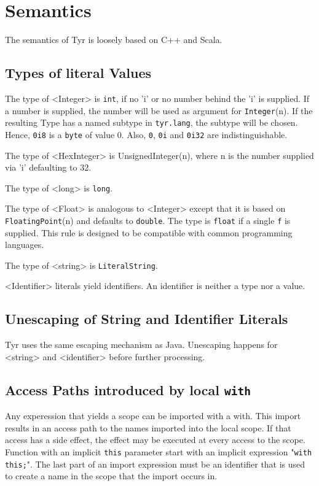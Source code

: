\section{Semantics}

The semantics of Tyr is loosely based on C++ and Scala.

\subsection{Types of literal Values}

The type of <Integer> is \texttt{int}, if no 'i' or no number behind the 'i' is supplied.
If a number is supplied, the number will be used as argument for \texttt{Integer}(n).
If the resulting Type has a named subtype in \texttt{tyr.lang}, the subtype will be chosen.
Hence, \texttt{0i8} is a \texttt{byte} of value 0.
Also, \texttt{0}, \texttt{0i} and \texttt{0i32} are indistinguishable.

The type of <HexInteger> is UnsignedInteger(n), where n is the number supplied via 'i' defaulting to 32.

The type of <long> is \texttt{long}.

The type of <Float> is analogous to <Integer> except that it is based on \texttt{FloatingPoint}(n) and defaults to \texttt{double}.
The type is \texttt{float} if a single \texttt{f} is supplied.
This rule is designed to be compatible with common programming languages.

The type of <string> is \texttt{LiteralString}.

<Identifier> literals yield identifiers.
An identifier is neither a type nor a value.

\subsection{Unescaping of String and Identifier Literals}

Tyr uses the same escaping mechanism as Java.
Unescaping happens for <string> and <identifier> before further processing.


\subsection{Access Paths introduced by local \texttt{with}}

Any experession that yields a scope can be imported with a with.
This import results in an access path to the names imported into the local scope.
If that access has a side effect, the effect may be executed at every access to the scope.
Function with an implicit \texttt{this} parameter start with an implicit expression "\texttt{with this;}".
The last part of an import expression must be an identifier that is used to create a name in the scope that the import occurs in.

